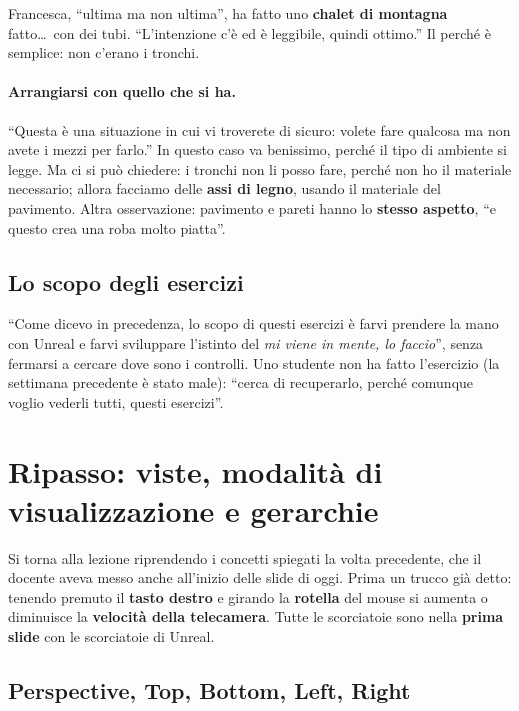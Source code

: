 Francesca, ``ultima ma non ultima'', ha fatto uno \textbf{chalet di montagna}
fatto\ldots\ con dei tubi. ``L'intenzione c'è ed è leggibile, quindi ottimo.'' Il
perché è semplice: non c'erano i tronchi.

\paragraph{Arrangiarsi con quello che si ha.} ``Questa è una situazione in cui vi
troverete di sicuro: volete fare qualcosa ma non avete i mezzi per farlo.'' In
questo caso va benissimo, perché il tipo di ambiente si legge. Ma ci si può
chiedere: i tronchi non li posso fare, perché non ho il materiale necessario;
allora facciamo delle \textbf{assi di legno}, usando il materiale del pavimento.
Altra osservazione: pavimento e pareti hanno lo \textbf{stesso aspetto}, ``e questo
crea una roba molto piatta''.

\subsection{Lo scopo degli esercizi}

``Come dicevo in precedenza, lo scopo di questi esercizi è farvi prendere la mano
con Unreal e farvi sviluppare l'istinto del \emph{mi viene in mente, lo faccio}'',
senza fermarsi a cercare dove sono i controlli. Uno studente non ha fatto
l'esercizio (la settimana precedente è stato male): ``cerca di recuperarlo, perché
comunque voglio vederli tutti, questi esercizi''.

\section{Ripasso: viste, modalità di visualizzazione e gerarchie}
\label{gd14:sec:ripasso}

Si torna alla lezione riprendendo i concetti spiegati la volta precedente, che il
docente aveva messo anche all'inizio delle slide di oggi. Prima un trucco già
detto: tenendo premuto il \textbf{tasto destro} e girando la \textbf{rotella} del
mouse si aumenta o diminuisce la \textbf{velocità della telecamera}. Tutte le
scorciatoie sono nella \textbf{prima slide} con le scorciatoie di Unreal.

\subsection{Perspective, Top, Bottom, Left, Right}

